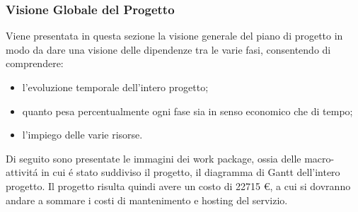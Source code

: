 \subsubsection{Visione Globale del Progetto}
Viene presentata in questa sezione la visione generale del piano di progetto in modo da
dare una visione delle dipendenze tra le varie fasi, consentendo di comprendere:
\begin{itemize}
\item l'evoluzione temporale dell'intero progetto;
\item quanto pesa percentualmente ogni fase sia in senso economico che di tempo;
\item l'impiego delle varie risorse.
\end{itemize}
Di seguito sono presentate le immagini dei work package, ossia delle macro-attivit\'a in cui
\'e stato suddiviso il progetto, il diagramma di Gantt dell'intero progetto.
Il progetto risulta quindi avere un costo di 22715 \euro{}, a cui si dovranno andare a
sommare i costi di mantenimento e hosting del servizio.

